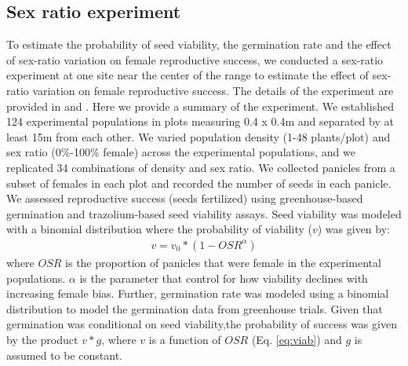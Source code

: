 \documentclass[12pt]{article}
\begin{document}
\subsection*{Sex ratio experiment}
\label{sec:experiment}
To estimate the probability of seed viability,  the germination rate and the effect of sex-ratio variation on female reproductive success, we conducted a sex-ratio experiment at one site near the center of the range to estimate the effect of sex-ratio variation on female reproductive success.
The details of the experiment are provided in \cite{compagnoni2017can} and \cite{miller2022two}.
Here we provide a summary of the experiment.
We established 124 experimental populations in plots measuring 0.4 x 0.4m and separated by at least 15m from each other.
We varied population density (1-48 plants/plot) and sex ratio (0\%-100\% female) across the experimental populations, and we replicated 34 combinations of density and sex ratio.
We collected panicles from a subset of females in each plot and recorded the number of seeds in each panicle.
We assessed reproductive success (seeds fertilized) using greenhouse-based germination and trazolium-based seed viability assays.
Seed viability was modeled with a binomial distribution where the probability of viability ($v$) was given by:
\begin{align}\label{eq:viab}
v = v_{0} * (1 - OSR^{\alpha})
\end{align}
\noindent where $OSR$ is the proportion of panicles that were female in the experimental populations.
$\alpha$ is the parameter that control for how viability declines with increasing female bias.
Further, germination rate was modeled using a binomial distribution to model the germination data from greenhouse trials.
Given that germination was conditional on seed viability,the probability of success was given by the product $v*g$, where $v$ is a function of $OSR$ (Eq. \ref{eq:viab}) and $g$ is assumed to be constant.
\end{document}
